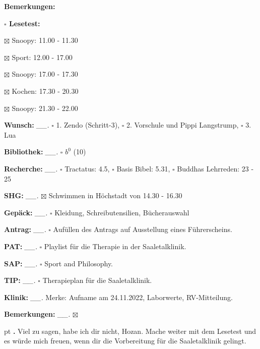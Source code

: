 \documentclass[10pt,a4paper]{article}
\newcounter{notec}
\newcommand\notep[1]{%
  \stepcounter{notec}
  \vskip #1pt
  {\bf\arabic{notec}.}
}
\newcommand\prop[1] {{\color {alizarin} {\bf #1}}}             %
\newcommand\opti[1] {{\color {amethyst} {\bf #1}}}             %
\newcommand\mand[1] {{\color {burntorange} {\bf #1}}}          %
\newcommand\bottomspace{\vskip 4pt}
\newcommand\n[1] { {\sl #1.} \hskip 5pt }
\begin{document}
\begin{mdframed}[style=daystyle]
\begin{labeling}{{\mand {Bemerkungen:}}}
\begin{minipage}{0.75\textwidth}
\begin{labeling}{\prop {$\square$ {Lesetest:}}}
      \item[$\boxtimes$ Snoopy:]   11.00 - 11.30
      \item[$\boxtimes$ Sport:]    12.00 - 17.00        
        
      \item[$\boxtimes$ Snoopy:]   17.00 - 17.30
      \item[$\boxtimes$ Kochen:]   17.30 - 20.30
        
      \item[$\boxtimes$ Snoopy:]   21.30 - 22.00
      \end{labeling}
    \end{minipage}
    \bottomspace
  \item[{\mand {Wunsch:}}]       \n{\_\_} $\square$ 1. Zendo (Schritt-3),
      $\square$ 2. Vorschule und Pippi Langstrump, $\square$ 3. Lua
  \item[{\mand {Bibliothek:}}]   \n{\_\_} $\square$ $b^{0}$ (10)
  \item[{\mand {Recherche:}}]    \n{\_\_} $\square$ Tractatus: 4.5, $\square$ Basis Bibel: 5.31,
      $\square$ Buddhas Lehrreden: 23 - 25
  \item[{\mand {SHG:}}]          \n{\_\_} $\boxtimes$ Schwimmen in Höchstadt von 14.30 - 16.30
  \item[{\mand {Gepäck:}}]       \n{\_\_} $\square$ Kleidung, Schreibutensilien, Bücherauswahl
  \item[{\opti {Antrag:}}]       \n{\_\_} $\square$ Aufüllen des Antrags auf Ausstellung eines Führerscheins.
  \item[{\opti {PAT:}}]          \n{\_\_} $\square$ Playlist für die Therapie in der Saaletalklinik.
  \item[{\opti {SAP:}}]          \n{\_\_} $\square$ Sport and Philosophy.
  \item[{\opti {TIP:}}]          \n{\_\_} $\square$ Therapieplan für die Saaletalklinik.
  \item[{\opti {Klinik:}}]       \n{\_\_} Merke: Aufname am 24.11.2022, Laborwerte, RV-Mitteilung.
  \item[{\mand {Bemerkungen:}}]  \n{\_\_} $\boxtimes$
  \end{labeling}
    
  \setcounter{notec}{0}
  
  \notep 0 Viel zu sagen, habe ich dir nicht, Hozan. Mache weiter mit dem
  Lesetest und es würde mich freuen, wenn dir die Vorbereitung für die
  Saaletalklinik gelingt.


\end{mdframed}
\end{document}

